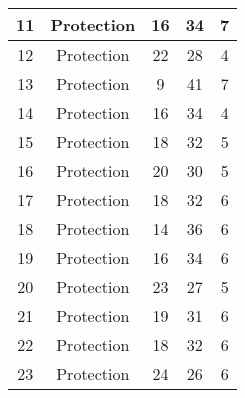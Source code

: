 \documentclass[results.tex]{subfiles}
\begin{document}
\begin{center}
\begin{tabular}{| c || c | c | c | c |}
            \hline
            11                      & Protection                   & 16                     & 34                      & 7                    \\
            \hline
            12                      & Protection                   & 22                     & 28                      & 4                    \\
            \hline
            13                      & Protection                   & 9                      & 41                      & 7                    \\
            \hline
            14                      & Protection                   & 16                     & 34                      & 4                    \\
            \hline
            15                      & Protection                   & 18                     & 32                      & 5                    \\
            \hline
            16                      & Protection                   & 20                     & 30                      & 5                    \\
            \hline
            17                      & Protection                   & 18                     & 32                      & 6                    \\
            \hline
            18                      & Protection                   & 14                     & 36                      & 6                    \\
            \hline
            19                      & Protection                   & 16                     & 34                      & 6                    \\
            \hline
            20                      & Protection                   & 23                     & 27                      & 5                    \\
            \hline
            21                      & Protection                   & 19                     & 31                      & 6                    \\
            \hline
            22                      & Protection                   & 18                     & 32                      & 6                    \\
            \hline
            23                      & Protection                   & 24                     & 26                      & 6                    \\

\end{tabular}
\end{center}
\end{document}

